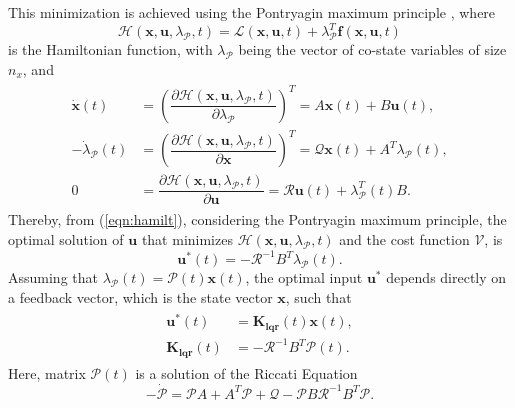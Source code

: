 This minimization is achieved using the Pontryagin maximum principle \cite{Murray2009}, where
\begin{equation}
\mathcal{H}(\mathbf{x},\mathbf{u},\lambda_\mathcal{P},t) = \mathcal{L}(\mathbf{x},\mathbf{u},t) + \lambda_\mathcal{P}^{T}\mathbf{f}(\mathbf{x}, \mathbf{u}, t)
\end{equation}
is the Hamiltonian function, with $\lambda_\mathcal{P}$ being the vector of co-state variables of size $\mathit{n_x}$, and
\begin{align}
\label{eqn:hamilt}
\begin{split}
\dot{\mathbf{x}}(t) & = \left(\dfrac{\partial \mathcal{H}(\mathbf{x},\mathbf{u},\lambda_\mathcal{P},t)}{\partial \lambda_\mathcal{P}}\right)^{T} = A\mathbf{x}(t)+B\mathbf{u}(t),\\[5px]
-\dot{\lambda}_{\mathcal{P}}(t) & = \left(\dfrac{\partial \mathcal{H}(\mathbf{x},\mathbf{u},\lambda_\mathcal{P},t)}{\partial \mathbf{x}}\right)^{T} = \mathcal{Q}\mathbf{x}(t) + A^{T}\lambda_{\mathcal{P}}(t),\\[5px]
0 & = \dfrac{\partial \mathcal{H}(\mathbf{x},\mathbf{u},\lambda_\mathcal{P},t)}{\partial \mathbf{u}} = \mathcal{R}\mathbf{u}(t) + \lambda_\mathcal{P}^{T}(t)B.
\end{split}
\end{align}
Thereby, from (\ref{eqn:hamilt}), considering the Pontryagin maximum principle, the optimal solution of $\mathbf{u}$ that minimizes $\mathcal{H}(\mathbf{x},\mathbf{u},\lambda_\mathcal{P},t)$ and the cost function $\mathcal{V}$, is
\begin{equation}
\mathbf{u}^{*}(t) = -\mathcal{R}^{-1}B^{T}\lambda_\mathcal{P}(t).
\end{equation}
Assuming that $\lambda_\mathcal{P}(t) = \mathcal{P}(t)\mathbf{x}(t)$, the optimal input $\mathbf{u}^{*}$ depends directly on a feedback vector, which is the state vector $\mathbf{x}$, such that
\begin{align}
\label{eqn:optimalu}
\begin{split}
\mathbf{u}^{*}(t) & = \mathbf{K_{lqr}}(t)\mathbf{x}(t),\\[5px]
\mathbf{K_{lqr}}(t) & = -\mathcal{R}^{-1}B^{T}\mathcal{P}(t).
\end{split}
\end{align}
Here, matrix $\mathcal{P}(t)$ is a solution of the Riccati Equation \cite{Moore1989}
	\begin{equation}
	-\dot{\mathcal{P}} = \mathcal{P}A + A^{T}\mathcal{P} + \mathcal{Q} - \mathcal{P}B\mathcal{R}^{-1}B^{T}\mathcal{P}.
	\end{equation}
